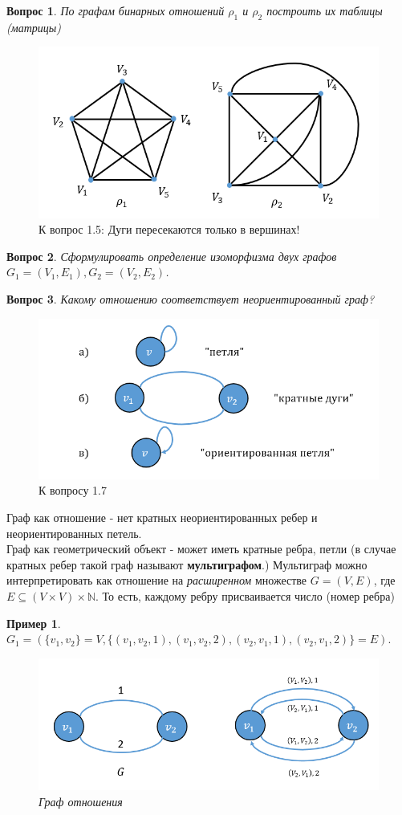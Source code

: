 \documentclass{article}
\newtheorem{example}{Пример}
\newtheorem{question}{Вопрос}
\numberwithin{example}{section}
\numberwithin{question}{section}
\numberwithin{Remark}{section}
\numberwithin{theorem}{section}
\numberwithin{definition}{section}
\numberwithin{proposition}{section}
\begin{document}
\begin{question}
	По графам бинарных отношений $\rho_1$ и $\rho_2$ построить их таблицы (матрицы)
\end{question}
\begin{figure}[!htp]
	\centering
	\includegraphics[width=0.5\linewidth]{1-4}
	\caption{К вопрос 1.5: Дуги пересекаются только в вершинах!}
	\label{fig:1-4}
\end{figure}
\begin{question}
	Сформулировать определение изоморфизма двух графов $G_1=(V_1,E_1), G_2=(V_2,E_2)$.
\end{question}
\begin{question}
	Какому отношению соответствует неориентированный граф?
\end{question}
\begin{figure}[!htp]
	\centering
	\includegraphics[width=0.6\linewidth]{1-5}
	\caption{К вопросу 1.7}
	\label{fig:1-5}
\end{figure}
Граф как отношение - нет кратных неориентированных ребер и неориентированных петель.\\
Граф как геометрический объект - может иметь кратные ребра, петли (в случае кратных ребер такой граф называют \textbf{мультиграфом}.) Мультиграф можно интерпретировать как отношение на \emph{расширенном} множестве $G=(V,E)$, где $E\subseteq (V\times V)\times\mathbb{N}$. То есть, каждому ребру присваивается число (номер ребра)
\begin{example}
$G_1=(\{v_1,v_2\}=V,\{(v_1,v_2,1),(v_1,v_2,2),(v_2,v_1,1),(v_2,v_1,2)\}=E).$
\begin{figure}[!htp]
	\centering
	\includegraphics[width=0.6\linewidth]{1-6}
	\caption{Граф отношения}
	\label{fig:1-6}
\end{figure}
\end{example}
\end{document}
